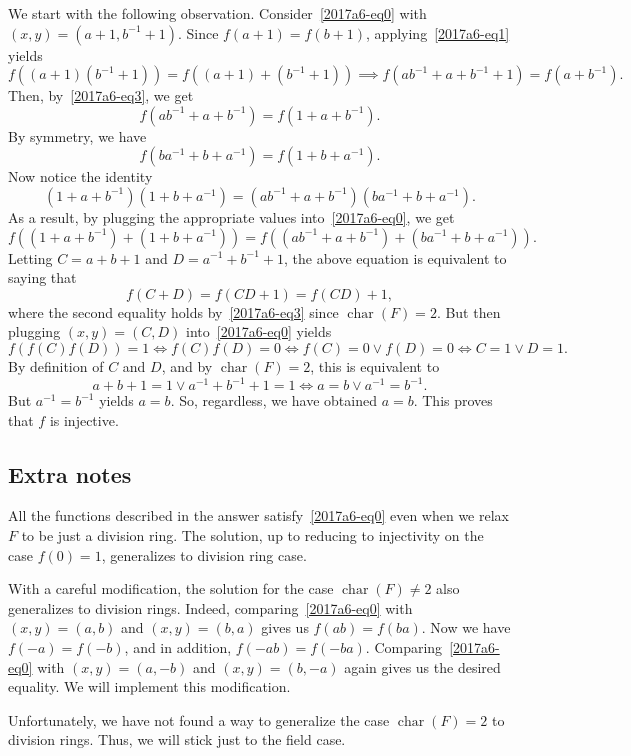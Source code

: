 \documentclass{article}
\DeclareMathOperator{\rchar}{char}
\begin{document}
We start with the following observation.
Consider~\eqref{2017a6-eq0} with $(x, y) = (a + 1, b^{-1} + 1)$.
Since $f(a + 1) = f(b + 1)$, applying~\eqref{2017a6-eq1} yields
\[ f((a + 1)(b^{-1} + 1)) = f((a + 1) + (b^{-1} + 1)) \implies f(ab^{-1} + a + b^{-1} + 1) = f(a + b^{-1}). \]
Then, by~\eqref{2017a6-eq3}, we get
\[ f(ab^{-1} + a + b^{-1}) = f(1 + a + b^{-1}). \]
By symmetry, we have
\[ f(ba^{-1} + b + a^{-1}) = f(1 + b + a^{-1}). \]
Now notice the identity
\[ (1 + a + b^{-1})(1 + b + a^{-1}) = (ab^{-1} + a + b^{-1})(ba^{-1} + b + a^{-1}). \]
As a result, by plugging the appropriate values into~\eqref{2017a6-eq0}, we get
\[ f((1 + a + b^{-1}) + (1 + b + a^{-1})) = f((ab^{-1} + a + b^{-1}) + (ba^{-1} + b + a^{-1})). \]
Letting $C = a + b + 1$ and $D = a^{-1} + b^{-1} + 1$, the above equation is equivalent to saying that
\[ f(C + D) = f(CD + 1) = f(CD) + 1, \]
    where the second equality holds by~\eqref{2017a6-eq3} since $\rchar(F) = 2$.
But then plugging $(x, y) = (C, D)$ into~\eqref{2017a6-eq0} yields
\[ f(f(C) f(D)) = 1 \iff f(C) f(D) = 0 \iff f(C) = 0 \vee f(D) = 0 \iff C = 1 \vee D = 1. \]
By definition of $C$ and $D$, and by $\rchar(F) = 2$, this is equivalent to
\[ a + b + 1 = 1 \vee a^{-1} + b^{-1} + 1 = 1 \iff a = b \vee a^{-1} = b^{-1}. \]
But $a^{-1} = b^{-1}$ yields $a = b$.
So, regardless, we have obtained $a = b$.
This proves that $f$ is injective.



\subsection*{Extra notes}

All the functions described in the answer satisfy~\eqref{2017a6-eq0} even when we relax $F$ to be just a division ring.
The solution, up to reducing to injectivity on the case $f(0) = 1$, generalizes to division ring case.

With a careful modification, the solution for the case $\rchar(F) \neq 2$ also generalizes to division rings.
Indeed, comparing~\eqref{2017a6-eq0} with $(x, y) = (a, b)$ and $(x, y) = (b, a)$ gives us $f(ab) = f(ba)$.
Now we have $f(-a) = f(-b)$, and in addition, $f(-ab) = f(-ba)$.
Comparing~\eqref{2017a6-eq0} with $(x, y) = (a, -b)$ and $(x, y) = (b, -a)$ again gives us the desired equality.
We will implement this modification.

Unfortunately, we have not found a way to generalize the case $\rchar(F) = 2$ to division rings.
Thus, we will stick just to the field case.
\end{document}
